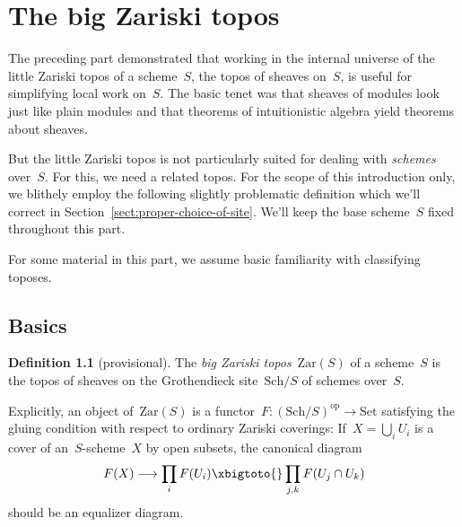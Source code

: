 \documentclass[10pt,reqno,a4paper]{amsbook}
\theoremstyle{definition}
\newtheorem{defn}{Definition}[section]
\theoremstyle{plain}
\theoremstyle{remark}
\newcommand{\Set}{\mathrm{Set}}
\newcommand{\Zar}{\mathrm{Zar}}
\newcommand{\Sch}{\mathrm{Sch}}
\newcommand{\op}{\mathrm{op}}
\newcommand{\?}{\,{:}\,}
\renewcommand{\_}{\mathpunct{.}\,}
\begin{document}
\chapter{The big Zariski topos}\label{part:big-zariski}

The preceding part demonstrated that working in the internal universe of
the little Zariski topos of a scheme~$S$, the topos of sheaves on~$S$, is
useful for simplifying local work on~$S$. The basic tenet was that sheaves of
modules look just like plain modules and that theorems of intuitionistic
algebra yield theorems about sheaves.

But the little Zariski topos is not particularly suited for dealing with
\emph{schemes} over~$S$. For this, we need a related topos. For the scope of
this introduction only, we blithely employ the following slightly problematic
definition which we'll correct in Section~\ref{sect:proper-choice-of-site}.
We'll keep the base scheme~$S$ fixed throughout this part.

For some material in this part, we assume basic familiarity with classifying
toposes.


\section{Basics}

\begin{defn}[provisional]The \emph{big Zariski topos}~$\Zar(S)$ of a scheme~$S$ is the
topos of sheaves on the Grothendieck site~$\Sch/S$ of schemes over~$S$.
\end{defn}

Explicitly, an object of~$\Zar(S)$ is a functor~$F : (\Sch/S)^\op \to \Set$
satisfying the gluing condition with respect to ordinary Zariski coverings:
If~$X = \bigcup_i U_i$ is a cover of an~$S$-scheme~$X$ by open subsets, the
canonical diagram
\[ F(X) \longrightarrow \prod_i F(U_i) \xbigtoto{} \prod_{j,k} F(U_j \cap U_k)
\]
should be an equalizer diagram.
\end{document}
